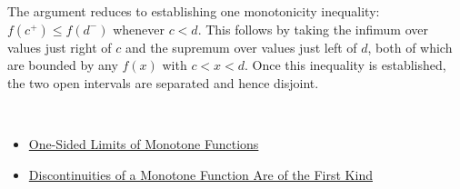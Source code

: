 \begin{remark*}
The argument reduces to establishing one monotonicity inequality: $f(c^{+}) \leq f(d^{-})$ whenever $c < d$. This follows by taking the infimum over values just right of $c$ and the supremum over values just left of $d$, both of which are bounded by any $f(x)$ with $c < x < d$. Once this inequality is established, the two open intervals are separated and hence disjoint.
\end{remark*}

\begin{remark*}[Dependencies]~\\
\begin{itemize}
  \item \hyperref[thm:monotone-one-sided-limits]{One-Sided Limits of Monotone Functions}
  \item \hyperref[prop:monotone-discontinuities-first-kind]{Discontinuities of a Monotone Function Are of the First Kind}
\end{itemize}
\end{remark*}

\clearpage
